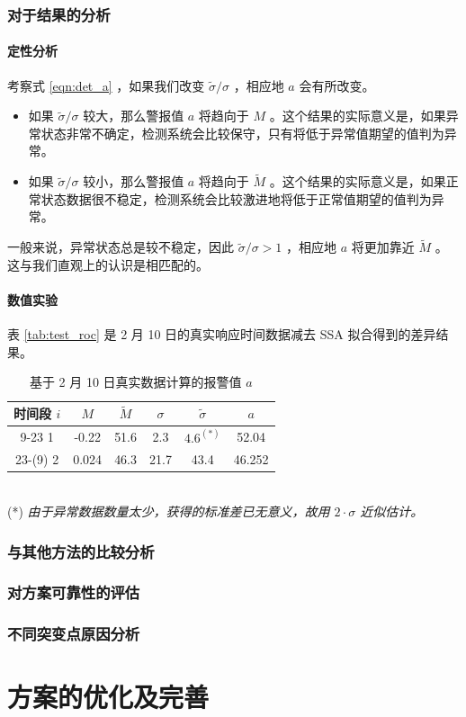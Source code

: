\documentclass[a4paper]{article}
\begin{document}
\section{对于结果的分析}
\subsection{定性分析}
考察式 \ref{eqn:det_a} ，如果我们改变 $\tilde{\sigma}/\sigma$ ，相应地 $a$ 会有所改变。
\begin{itemize}
\item 如果 $\tilde{\sigma}/\sigma$ 较大，那么警报值 $a$ 将趋向于 $M$ 。这个结果的实际意义是，如果异常状态非常不确定，检测系统会比较保守，只有将低于异常值期望的值判为异常。
\item 如果 $\tilde{\sigma}/\sigma$ 较小，那么警报值 $a$ 将趋向于 $\tilde{M}$ 。这个结果的实际意义是，如果正常状态数据很不稳定，检测系统会比较激进地将低于正常值期望的值判为异常。
\end{itemize}
一般来说，异常状态总是较不稳定，因此 $\tilde{\sigma}/\sigma > 1$ ，相应地 $a$ 将更加靠近 $\tilde{M}$ 。
这与我们直观上的认识是相匹配的。
\subsection{数值实验}
表 \ref{tab:test_roc} 是 2 月 10 日的真实响应时间数据减去 SSA 拟合得到的差异结果。
\begin{table}[htbp]
	\centering
	\caption{基于 2 月 10 日真实数据计算的报警值 $a$}
	\label{tab:test_roc}
\label{my-label}
\begin{tabular}{c|cccc|c}
\hline
时间段 $i$  & $M$   & $\tilde{M}$ & $\sigma$ & $\tilde{\sigma}$ & $a$    \\
\hline
9-23 1   & -0.22 & 51.6        & 2.3     & $4.6^{(*)} $             & 52.04  \\
23-(9) 2 & 0.024 & 46.3        & 21.7    & 43.4             & 46.252\\
\hline
\end{tabular}
\end{table}\\
(*) \emph{由于异常数据数量太少，获得的标准差已无意义，故用 $2 \cdot \sigma$ 近似估计。}
\section{与其他方法的比较分析}
\section{对方案可靠性的评估}
\section{不同突变点原因分析}

\part{方案的优化及完善}
\end{document}
